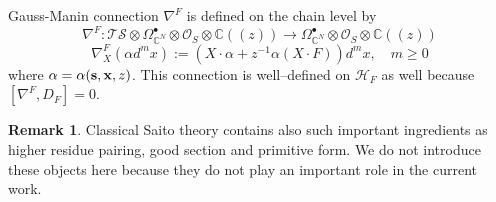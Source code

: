 \documentclass[reqno,12pt]{amsart}
\numberwithin{equation}{section}
\theoremstyle{plain}
\theoremstyle{definition}
\newtheorem{remark}[theorem]{Remark}
\newcommand{\CC}{{\mathbb{C}}}
\newcommand{\bs}{{\bf s}}
\newcommand{\bx}{{\bf x}}
\def\H{{\mathcal H}}
\def\O{{\mathcal O}}
\numberwithin{equation}{section}
\begin{document}

Gauss-Manin connection $\nabla^F$ is defined on the chain level by
\[
    \nabla^F:  \mathcal{TS} \otimes \Omega^{\bullet}_{\CC^N}\otimes \O_{S} \otimes \CC ((z)) \to  \Omega^{\bullet}_{\CC^N}\otimes  \O_{S} \otimes\CC ((z))
\]
\[
\nabla^F_X \left( \alpha d^m x \right) := \left(X \cdot \alpha + z^{-1} \alpha (X \cdot F)  \right) d^mx, \quad m \ge 0
\]
where $\alpha = \alpha(\bs,\bx,z)$. This connection is well--defined on $\H_F$ as well because $[\nabla^F, D_F] = 0$.

\begin{remark}
 Classical Saito theory contains also such important ingredients as higher residue pairing, good section and primitive form. We do not introduce these objects here because they do not play an important role in the current work.
\end{remark}
\end{document}
